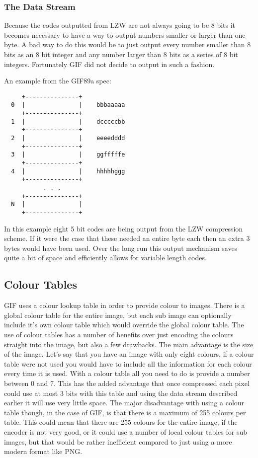 \documentclass[11pt]{article} %
\begin{document}
\subsubsection{The Data Stream}
Because the codes outputted from LZW are not always going to be 8 bits it becomes necessary to have a way to output numbers smaller or larger than one byte. A bad way to do this would be to just output every number smaller than 8 bits as an 8 bit integer and any number larger than 8 bits as a series of 8 bit integers. Fortunately GIF did not decide to output in such a fashion.

An example from the GIF89a spec:
\begin{verbatim}
     +---------------+
  0  |               |    bbbaaaaa
     +---------------+
  1  |               |    dcccccbb
     +---------------+
  2  |               |    eeeedddd
     +---------------+
  3  |               |    ggfffffe
     +---------------+
  4  |               |    hhhhhggg
     +---------------+
           . . .
     +---------------+
  N  |               |
     +---------------+
\end{verbatim}


In this example eight 5 bit codes are being output from the LZW compression scheme. If it were the case that these needed an entire byte each then an extra 3 bytes would have been used. Over the long run this output mechanism saves quite a bit of space and efficiently allows for variable length codes.

\subsection{Colour Tables}
GIF uses a colour lookup table in order to provide colour to images. There is a global colour table for the entire image, but each sub image can optionally include it's own colour table which would override the global colour table. The use of colour tables has a number of benefits over just encoding the colours straight into the image, but also a few drawbacks. The main advantage is the size of the image. Let's say that you have an image with only eight colours, if a colour table were not used you would have to include all the information for each colour every time it is used. With a colour table all you need to do is provide a number between 0 and 7. This has the added advantage that once compressed each pixel could use at most 3 bits with this table and using the data stream described earlier it will use very little space. The major disadvantage with using a colour table though, in the case of GIF, is that there is a maximum of 255 colours per table. This could mean that there are 255 colours for the entire image, if the encoder is not very good, or it could use a number of local colour tables for sub images, but that would be rather inefficient compared to just using a more modern format like PNG.
\end{document}
